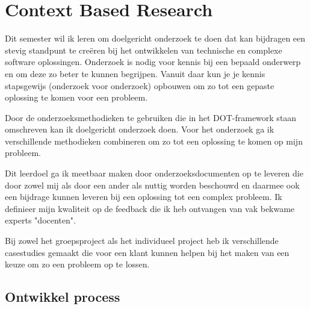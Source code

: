 \newpage


\section{Context Based Research}\label{sec:context-based-research}


Dit semester wil ik leren om doelgericht onderzoek te doen dat kan bijdragen een stevig
standpunt te creëren bij het ontwikkelen van technische en complexe software oplossingen.
Onderzoek is nodig voor kennis bij een bepaald onderwerp en om deze zo beter te kunnen begrijpen.
Vanuit daar kun je je kennis stapsgewijs (onderzoek voor onderzoek) opbouwen om zo tot een gepaste oplossing te
komen voor een probleem.


Door de onderzoeksmethodieken te gebruiken die in het DOT-framework staan omschreven kan ik doelgericht onderzoek
doen.
Voor het onderzoek ga ik verschillende methodieken combineren om zo tot een oplossing te komen op mijn probleem.


Dit leerdoel ga ik meetbaar maken door onderzoeksdocumenten op te leveren die door zowel mij als door een ander als
nuttig worden beschouwd en daarmee ook een bijdrage kunnen leveren bij een oplossing tot een complex probleem.
Ik definieer mijn kwaliteit op de feedback die ik heb ontvangen van vak bekwame experts "docenten".

Bij zowel het groepsproject als het individueel project heb ik verschillende casestudies gemaakt die voor een klant
kunnen helpen bij het maken van een keuze om zo een probleem op te lossen.

\bigskip
\subsection{Ontwikkel process}

